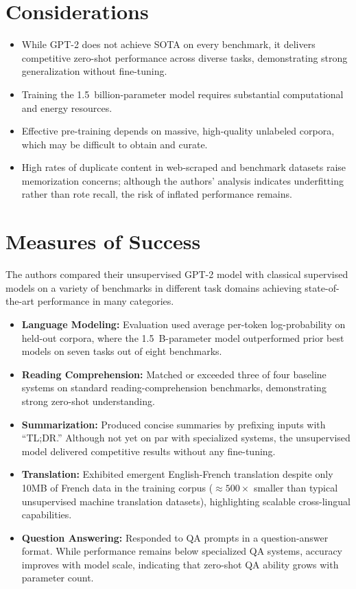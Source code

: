 \documentclass[10pt]{article}
\begin{document}
\section*{Considerations}
\begin{itemize}
    \item While GPT-2 does not achieve SOTA on every benchmark, it delivers competitive zero-shot performance across diverse tasks, demonstrating strong generalization without fine-tuning.
    \item Training the 1.5~billion-parameter model requires substantial computational and energy resources.
    \item Effective pre-training depends on massive, high-quality unlabeled corpora, which may be difficult to obtain and curate.
    \item High rates of duplicate content in web-scraped and benchmark datasets raise memorization concerns; although the authors' analysis indicates underfitting rather than rote recall, the risk of inflated performance remains.
\end{itemize}

\section*{Measures of Success}
The authors compared their unsupervised GPT-2 model with classical supervised models on a variety of benchmarks in different task domains achieving state-of-the-art performance in many categories.

\begin{itemize}
    \item \textbf{Language Modeling:} Evaluation used average per-token log-probability on held-out corpora, where the 1.5~B-parameter model outperformed prior best models on seven tasks out of eight benchmarks.
    \item \textbf{Reading Comprehension:} Matched or exceeded three of four baseline systems on standard reading-comprehension benchmarks, demonstrating strong zero-shot understanding.
    \item \textbf{Summarization:} Produced concise summaries by prefixing inputs with “TL;DR.” Although not yet on par with specialized systems, the unsupervised model delivered competitive results without any fine-tuning.
    \item \textbf{Translation:} Exhibited emergent English-French translation despite only 10MB of French data in the training corpus (\(\approx 500\times\) smaller than typical unsupervised machine translation datasets), highlighting scalable cross-lingual capabilities.
    \item \textbf{Question Answering:} Responded to QA prompts in a question-answer format. While performance remains below specialized QA systems, accuracy improves with model scale, indicating that zero-shot QA ability grows with parameter count.
\end{itemize}
\end{document}
